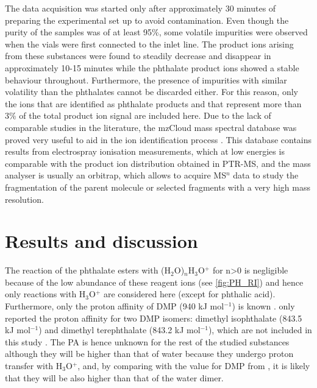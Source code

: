 The data acquisition was started only after approximately 30 minutes of preparing the experimental set up to avoid contamination.
%
Even though the purity of the samples was of at least 95\%, some volatile impurities were observed when the vials were first connected to the inlet line.
%
The product ions arising from these substances were found to steadily decrease and disappear in approximately 10-15 minutes while the phthalate product ions showed a stable behaviour throughout.
%
Furthermore, the presence of impurities with similar volatility than the phthalates cannot be discarded either. 
%
For this reason, only the  ions that are identified as phthalate products and that represent more than 3\% of the total product ion signal are included here.
%
Due to the lack of comparable studies in the literature, the mzCloud mass spectral database was proved very useful to aid in the ion identification process \cite{mzcloudd}.
%
 This database contains results from electrospray ionisation measurements, which at low energies is comparable with the product ion distribution obtained in PTR-MS, and the mass analyser is usually an orbitrap, which allows to acquire MS$^n$ data  to study the fragmentation of the parent molecule or selected fragments with a very high mass resolution.%







\section{Results and discussion}
The reaction of the phthalate esters with (H$_2$O)$_n$H$_3$O$^+$ for n>0 is negligible because of the low abundance of these reagent ions (see \autoref{fig:PH_RI}) and hence only reactions with H$_3$O$^+$ are considered here (except for phthalic acid).
%
Furthermore, only the proton affinity of DMP (940 kJ mol$^{-1}$) %
is known  \cite{michalczuk2019isomer}. 
%
\citeauthor{doi:10.1063/1.556018}  only reported the proton affinity for two DMP isomers: dimethyl isophthalate (843.5 kJ mol$^{-1}$) and dimethyl terephthalate (843.2 kJ mol$^{-1}$), which are not included in this study \cite{doi:10.1063/1.556018}.
%
The PA is hence unknown for the rest of the studied substances although they will  be higher than that of water because they undergo proton transfer with H$_3$O$^+$, and, by comparing with the value for DMP from \citeauthor{michalczuk2019isomer}, it is likely that they will be also higher than that of the water dimer.
 
